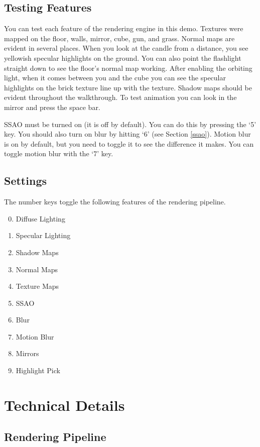 \documentclass[oneside]{book}
\begin{document}
  \section{Testing Features}
    You can test each feature of the rendering engine in this demo. Textures were mapped on the floor, walls, mirror, cube, gun, and grass. Normal maps are evident in several places. When you look at the candle from a distance, you see yellowish specular highlights on the ground. You can also point the flashlight straight down to see the floor's normal map working. After enabling the orbiting light, when it comes between you and the cube you can see the specular highlights on the brick texture line up with the texture. Shadow maps should be evident throughout the walkthrough. To test animation you can look in the mirror and press the space bar.

    SSAO must be turned on (it is off by default). You can do this by pressing the `5' key. You should also turn on blur by hitting `6' (see Section \ref{ssao}).
    Motion blur is on by default, but you need to toggle it to see the difference it makes. You can toggle motion blur with the `7' key.

  \section{Settings}\label{settings}
    The number keys toggle the following features of the rendering pipeline.
    \begin{enumerate}
      \setcounter{enumi}{-1}
      \item Diffuse Lighting
      \item Specular Lighting
      \item Shadow Maps
      \item Normal Maps
      \item Texture Maps
      \item SSAO
      \item Blur
      \item Motion Blur
      \item Mirrors
      \item Highlight Pick
    \end{enumerate}

\chapter{Technical Details}
  \section{Rendering Pipeline}
\end{document}
